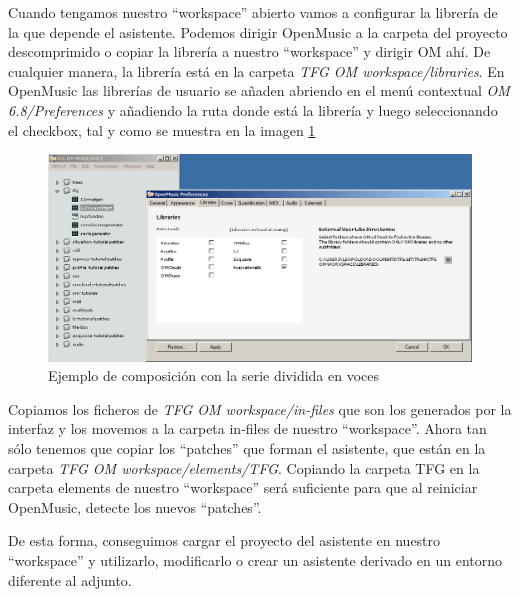 \documentclass[a4paper,openany,oneside,12pt]{book}
\begin{document}
Cuando tengamos nuestro ``workspace'' abierto vamos a configurar la librería de la que depende el asistente. Podemos dirigir OpenMusic a la carpeta del proyecto descomprimido o copiar la librería a nuestro ``workspace'' y dirigir OM ahí. De cualquier manera, la librería está en la carpeta \emph{TFG OM workspace/libraries}. En OpenMusic las librerías de usuario se añaden abriendo en el menú contextual \emph{OM 6.8/Preferences} y añadiendo la ruta donde está la librería y luego seleccionando el checkbox, tal y como se muestra en la imagen \ref{fig:configom}


\begin{figure}
\centering
\includegraphics[width=\textwidth]{img/configom.png}
\caption{Ejemplo de composición con la serie dividida en voces} \label{fig:configom}
\end{figure}

Copiamos los ficheros de \emph{TFG OM workspace/in-files} que son los generados por la interfaz y los movemos a la carpeta in-files de nuestro ``workspace''. Ahora tan sólo tenemos que copiar los ``patches'' que forman el asistente, que están en la carpeta \emph{TFG OM workspace/elements/TFG}. Copiando la carpeta TFG en la carpeta elements de nuestro ``workspace'' será suficiente para que al reiniciar OpenMusic, detecte los nuevos ``patches''.

De esta forma, conseguimos cargar el proyecto del asistente en nuestro ``workspace'' y utilizarlo, modificarlo o crear un asistente derivado en un entorno diferente al adjunto.
\end{document}
